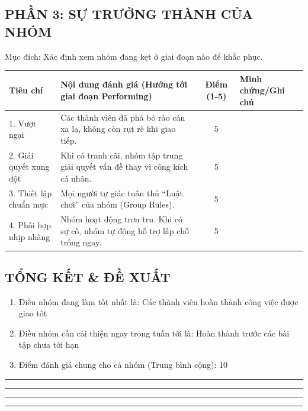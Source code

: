 \documentclass{article}
\begin{document}
\subsection{PHẦN 3: SỰ TRƯỞNG THÀNH CỦA NHÓM}
\noindent Mục đích: Xác định xem nhóm đang kẹt ở giai đoạn nào để khắc phục.

\begin{tabularx}{\textwidth}{|l|X|c|X|}
\hline
\textbf{Tiêu chí} & \textbf{Nội dung đánh giá (Hướng tới giai đoạn Performing)} & \textbf{Điểm (1-5)} & \textbf{Minh chứng/Ghi chú} \\ \hline
1. Vượt ngại & Các thành viên đã phá bỏ rào cản xa lạ, không còn rụt rè khi giao tiếp. & 5 & \\ \hline
2. Giải quyết xung đột & Khi có tranh cãi, nhóm tập trung giải quyết vấn đề thay vì công kích cá nhân. & 5 & \\ \hline
3. Thiết lập chuẩn mực & Mọi người tự giác tuân thủ ``Luật chơi'' của nhóm (Group Rules). & 5 & \\ \hline
4. Phối hợp nhịp nhàng & Nhóm hoạt động trơn tru. Khi có sự cố, nhóm tự động hỗ trợ lấp chỗ trống ngay. & 5 & \\ \hline
\end{tabularx}

\subsection{TỔNG KẾT \& ĐỀ XUẤT}
\begin{enumerate}
\item Điều nhóm đang làm tốt nhất là: Các thành viên hoàn thành công việc được giao tốt
\item Điều nhóm cần cải thiện ngay trong tuần tới là: Hoàn thành trước các bài tập chưa tới hạn
\item Điểm đánh giá chung cho cả nhóm (Trung bình cộng): 10
\end{enumerate}


\vspace{1cm}
\hrule

\vspace{1cm}
\hrule

\vspace{1cm}
\hrule

\vspace{1cm}
\hrule

\end{document}
